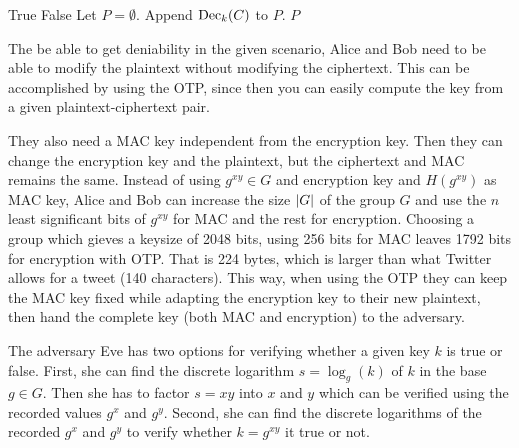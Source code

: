 \begin{algorithm}
  \caption{%
    Algorithm for finding possible plaintexts and discarding false keys.
  }
  \label{alg:falsekeys}
  \begin{algorithmic}
        \State \Return True
      \EndIf
      \State \Return False
    \EndFunction
    \Statex
      \State Let $P = \emptyset$.
          \State Append $\operatorname{\mathrm{Dec}}_k( C )$ to $P$.
        \EndIf
      \EndFor
      \State \Return $P$
    \EndFunction
  \end{algorithmic}
\end{algorithm}

The be able to get deniability in the given scenario, Alice and Bob need to be 
able to modify the plaintext without modifying the ciphertext.
This can be accomplished by using the \ac{OTP}, since then you can easily 
compute the key from a given plaintext-ciphertext pair.

They also need a \ac{MAC} key independent from the encryption key.
Then they can change the encryption key and the plaintext, but the ciphertext 
and \ac{MAC} remains the same.
Instead of using \(g^{xy}\in G\) and encryption key and \(H(g^{xy})\) as 
\ac{MAC} key, Alice and Bob can increase the size \(|G|\) of the group \(G\) 
and use the \(n\) least significant bits of \(g^{xy}\) for \ac{MAC} and the 
rest for encryption.
Choosing a group which gieves a keysize of 2048 bits, using 256 bits for 
\ac{MAC} leaves 1792 bits for encryption with \ac{OTP}.
That is 224 bytes, which is larger than what Twitter allows for a tweet (140 
characters).
This way, when using the \ac{OTP} they can keep the \ac{MAC} key fixed while 
adapting the encryption key to their new plaintext, then hand the complete key 
(both \ac{MAC} and encryption) to the adversary.

The adversary Eve has two options for verifying whether a given key \(k\) is 
true or false.
First, she can find the discrete logarithm \(s = \log_g( k )\) of \(k\) in the 
base \(g\in G\).
Then she has to factor \(s = xy\) into \(x\) and \(y\) which can be verified 
using the recorded values \(g^x\) and \(g^y\).
Second, she can find the discrete logarithms of the recorded \(g^x\) and 
\(g^y\) to verify whether \(k = g^{xy}\) it true or not.

